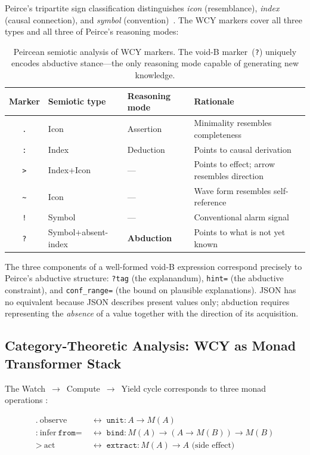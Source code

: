 \documentclass[11pt,a4paper]{article}
\begin{document}
Peirce's tripartite sign classification distinguishes \emph{icon} (resemblance), \emph{index} (causal connection), and \emph{symbol} (convention)~\citep{peirce1934collected}. The WCY markers cover all three types and all three of Peirce's reasoning modes:

\begin{table}[H]
\centering
\small
\begin{tabular}{@{}clll@{}}
\toprule
\textbf{Marker} & \textbf{Semiotic type} & \textbf{Reasoning mode} & \textbf{Rationale} \\
\midrule
\texttt{.} & Icon    & Assertion     & Minimality resembles completeness \\
\texttt{:} & Index   & Deduction     & Points to causal derivation \\
\texttt{>} & Index+Icon & ---         & Points to effect; arrow resembles direction \\
\texttt{\textasciitilde} & Icon & ---  & Wave form resembles self-reference \\
\texttt{!} & Symbol  & ---           & Conventional alarm signal \\
\texttt{?} & Symbol+absent-index & \textbf{Abduction} & Points to what is not yet known \\
\bottomrule
\end{tabular}
\caption{Peircean semiotic analysis of WCY markers. The void-B marker~(\texttt{?}) uniquely encodes abductive stance---the only reasoning mode capable of generating new knowledge.}
\label{tab:semiotics}
\end{table}

The three components of a well-formed void-B expression correspond precisely to Peirce's abductive structure: \texttt{?tag} (the explanandum), \texttt{hint=} (the abductive constraint), and \texttt{conf\_range=} (the bound on plausible explanations). JSON has no equivalent because JSON describes present values only; abduction requires representing the \emph{absence} of a value together with the direction of its acquisition.

\subsection{Category-Theoretic Analysis: WCY as Monad Transformer Stack}

The Watch~$\to$~Compute~$\to$~Yield cycle corresponds to three monad operations \citep{moggi1991notions,maclane1978categories}:

\begin{align}
  \texttt{.}~\text{observe} &\;\longleftrightarrow\; \mathtt{unit} : A \to M(A) \\
  \texttt{:}~\text{infer}~\texttt{from=} &\;\longleftrightarrow\; \mathtt{bind} : M(A) \to (A \to M(B)) \to M(B) \\
  \texttt{>}~\text{act} &\;\longleftrightarrow\; \mathtt{extract} : M(A) \to A \text{ (side effect)}
\end{align}
\end{document}
